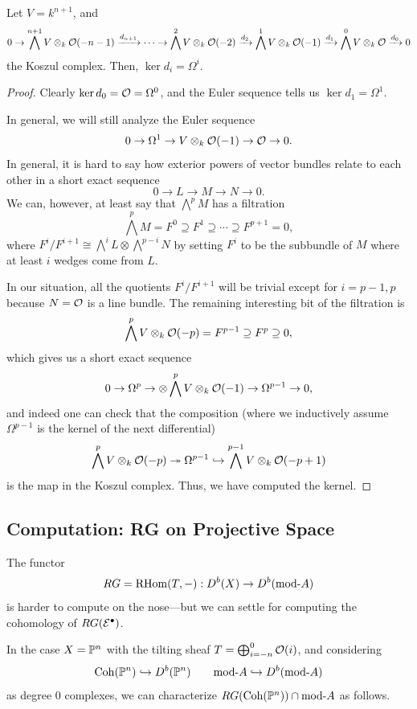 \documentclass[12pt]{article}
\begin{document}
\begin{prop}
    Let $V=k^{n+1}$, and
    \[0 \to \bigwedge^{n+1} V \otimes_k \cO(-n-1) \xrightarrow{d_{n+1}} \cdots \to \bigwedge^2 V \otimes_k \cO(-2) \xrightarrow{d_2} \bigwedge^1 V \otimes_k \cO(-1) \xrightarrow{d_1} \bigwedge^0 V \otimes_k \cO \xrightarrow{d_0} 0\]
    the Koszul complex. Then, $\ker d_i = \Omega^i$.
\end{prop}
\begin{proof}
    Clearly $\ker d_0 = \cO = \Omega^0$, and the Euler sequence tells us $\ker d_1 = \Omega^1$.

    In general, we will still analyze the Euler sequence
    \[0 \to \Omega^1 \to V \otimes_k \cO(-1) \to \cO \to 0.\]
    In general, it is hard to say how exterior powers of vector bundles relate to each other in a short exact sequence
    \[0 \to L \to M \to N \to 0.\]
    We can, however, at least say that $\bigwedge^p M$ has a filtration
    \[\bigwedge^p M = F^0 \supseteq F^1 \supseteq \cdots \supseteq F^{p+1} = 0,\]
    where $F^i/F^{i+1} \cong \bigwedge^i L \otimes \bigwedge^{p-i} N$ by setting $F^i$ to be the subbundle of $M$ where at least $i$ wedges come from $L$.

    In our situation, all the quotients $F^i/F^{i+1}$ will be trivial except for $i=p-1,p$ because $N=\cO$ is a line bundle. The remaining interesting bit of the filtration is
    \[\bigwedge^p V\otimes_k \cO(-p) = F^{p-1} \supseteq F^p \supseteq 0,\]
    which gives us a short exact sequence
    \[0 \to \Omega^p \to \otimes \bigwedge^p V\otimes_k \cO(-1) \to \Omega^{p-1} \to 0,\]
    and indeed one can check that the composition (where we inductively assume $\Omega^{p-1}$ is the kernel of the next differential)
    \[\bigwedge^p V\otimes_k \cO(-p) \twoheadrightarrow \Omega^{p-1} \hookrightarrow \bigwedge^{p-1} V \otimes_k \cO(-p+1)\]
    is the map in the Koszul complex. Thus, we have computed the kernel.
\end{proof}

\subsection{Computation: RG on Projective Space}

The functor
\[RG = \RHom(T,-): D^b(X) \to D^b(\rmod A)\]
is harder to compute on the nose---but we can settle for computing the cohomology of $RG(\cE^\bullet)$.

In the case $X=\P^n$ with the tilting sheaf $T=\bigoplus_{i=-n}^0 \cO(i)$, and considering
\[\Coh(\P^n) \hookrightarrow D^b(\P^n) \qquad \rmod A \hookrightarrow D^b(\rmod A)\]
as degree 0 complexes, we can characterize $RG(\Coh(\P^n)) \cap \rmod A$ as follows.
\end{document}

